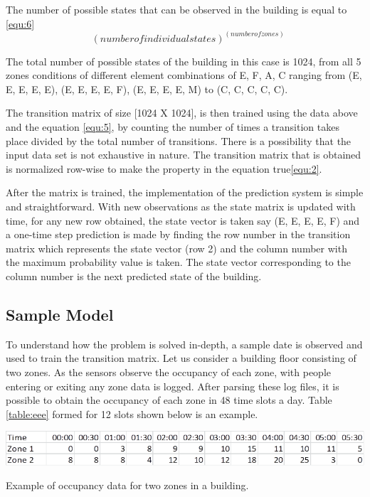 The number of possible states that can be observed in the building is equal to \ref{equ:6}
\begin{equation}
\label{equ:6}
\text{ ${(number of individual states)}^{(number of zones)}$}
\end{equation}

The total number of possible states of the building in this case is 1024,  from all 5 zones conditions of different element combinations of {E, F, A, C} ranging from {(E, E, E, E, E)}, {(E, E, E, E, F)}, {(E, E, E, E, M)} to {(C, C, C, C, C)}.

The transition matrix of size  [1024 X 1024], is then trained using the data above and the equation \ref{equ:5}, by counting the number of times a transition takes place divided by the total number of transitions.  There is a possibility that the input data set is not exhaustive in nature.  The transition matrix that is obtained is normalized row-wise to make the property in the equation true\ref{equ:2}.

After the matrix is trained, the implementation of the prediction system is simple and straightforward.  With new observations as the state matrix is updated with time, for any new row obtained, the state vector is taken say ({E, E, E, E, F}) and a one-time step prediction is made by finding the row number in the transition matrix which represents the state vector (row 2) and the column number with the maximum probability value is taken.  The state vector corresponding to the column number is the next predicted state of the building.

\subsection{Sample Model}

To understand how the problem is solved in-depth,  a sample date is observed and used to train the transition matrix. Let us consider a building floor consisting of two zones.  As the sensors observe the occupancy of each zone, with people entering or exiting any zone data is logged.  After parsing these log files, it is possible to obtain the occupancy of each zone in 48 time slots a day.   Table \ref{table:eee} formed for 12 slots  shown below is an example.
\begin{table}[!ht]
  \centering
      \includegraphics[width=0.9\columnwidth]{./images/t1.png}
  \caption{Example of occupancy data for two zones in a building.}\label{table:eee}
\end{table}

